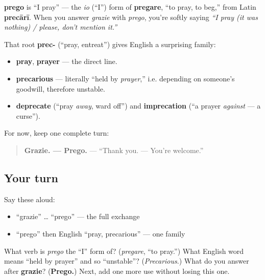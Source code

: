 \begin{cousinweb}
\textbf{prego} is \textquotedblleft{}I pray\textquotedblright{} — the \emph{io} (\textquotedblleft{}I\textquotedblright{}) form of \textbf{pregare}, \textquotedblleft{}to pray, to beg,\textquotedblright{} from Latin \textbf{precārī}. When you answer \emph{grazie} with \emph{prego}, you're softly saying \emph{\textquotedblleft{}I pray (it was nothing) / please, don't mention it.\textquotedblright{}}

That root \textbf{prec-} (\textquotedblleft{}pray, entreat\textquotedblright{}) gives English a surprising family:

\begin{itemize}
\raggedright
  \item \textbf{pray}, \textbf{prayer} — the direct line.
  \item \textbf{precarious} — literally \textquotedblleft{}held by \emph{prayer},\textquotedblright{} i.e. depending on someone's goodwill, therefore unstable.
  \item \textbf{deprecate} (\textquotedblleft{}pray \emph{away}, ward off\textquotedblright{}) and \textbf{imprecation} (\textquotedblleft{}a prayer \emph{against} — a curse\textquotedblright{}).
\end{itemize}

For now, keep one complete turn:

\begin{quote}
\textbf{Grazie. — Prego.} — \textquotedblleft{}Thank you. — You're welcome.\textquotedblright{}
\end{quote}
\end{cousinweb}

\subsection*{Your turn}
Say these aloud:

\begin{itemize}
\raggedright
  \item \textquotedblleft{}grazie\textquotedblright{} … \textquotedblleft{}prego\textquotedblright{} — the full exchange
  \item \textquotedblleft{}prego\textquotedblright{} then English \textquotedblleft{}pray, precarious\textquotedblright{} — one family
\end{itemize}

\begin{tcolorbox}[breakable,colback=teal!4,colframe=teal!35!black,title={Before you move on}]
What verb is \emph{prego} the \textquotedblleft{}I\textquotedblright{} form of? (\emph{pregare}, \textquotedblleft{}to pray.\textquotedblright{}) What English word means \textquotedblleft{}held by prayer\textquotedblright{} and so \textquotedblleft{}unstable\textquotedblright{}? (\emph{Precarious}.) What do you answer after \textbf{grazie}? (\textbf{Prego.}) Next, add one more use without losing this one.
\end{tcolorbox}
